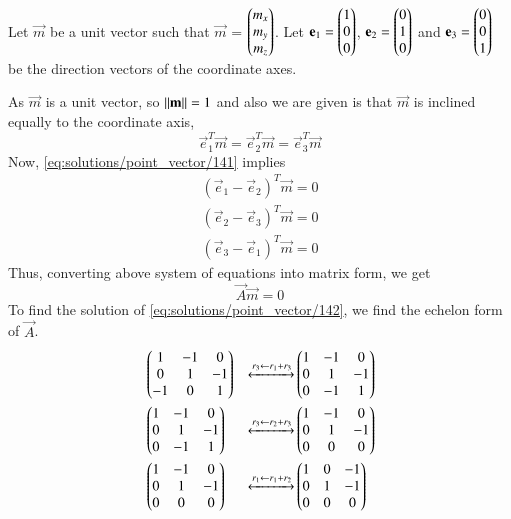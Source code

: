Let $\vec{m}$ be a unit vector such that $\vec{m}$ = $\begin{pmatrix}m_x \\ m_y \\ m_z\end{pmatrix}$. Let $\mathbf{e}_1=\begin{pmatrix}1 \\ 0 \\ 0\end{pmatrix}$, $\mathbf{e}_2=\begin{pmatrix}0 \\ 1 \\ 0\end{pmatrix}$ and $\mathbf{e}_3=\begin{pmatrix}0 \\ 0 \\ 1\end{pmatrix}$ be the direction vectors of the coordinate axes. 

As $\vec{m}$ is a unit vector, so $\left\lVert\mathbf{m}\right\rVert =1$ and also we are given is that $\vec{m}$ is inclined equally to the coordinate axis,
\begin{equation}
\label{eq:solutions/point_vector/141}
	\vec{e}_1^T\vec{m} =\vec{e}_2^T\vec{m}=\vec{e}_3^T\vec{m}
\end{equation}
Now, \ref{eq:solutions/point_vector/141} implies 
\begin{align}
	(\vec{e}_1 -\vec{e}_2)^T\vec{m} = 0 \\
	(\vec{e}_2 -\vec{e}_3)^T\vec{m} = 0 \\
	(\vec{e}_3 -\vec{e}_1)^T\vec{m} = 0
\end{align}
Thus, converting above system of equations into matrix form, we get
\begin{equation}
\label{eq:solutions/point_vector/142}
	\vec{A}\vec{m} = 0
\end{equation}
To find the solution of \ref{eq:solutions/point_vector/142}, we find the  echelon form of  $\vec{A}$.
\begin{align}
	& \begin{pmatrix}  1  & -1 &  0 \\  0 &  1 & -1 \\ -1 &  0 &  1 \end{pmatrix} & \xleftrightarrow[]{r_3 \leftarrow r_1 + r_3}  & \begin{pmatrix} 1 & -1 &  0 \\ 0 &  1 & -1 \\ 0 & -1 & 1 \end{pmatrix} \\
	& \begin{pmatrix}1 & -1 & 0 \\ 0 & 1 & -1 \\ 0 & -1 & 1 \end{pmatrix}  &        \xleftrightarrow[]{r_3 \leftarrow r_2 + r_3}  & \begin{pmatrix}1 & -1 & 0 \\ 0 & 1 & -1 \\ 0 & 0 & 0 \end{pmatrix} \\
	& \begin{pmatrix}1 &  -1 & 0 \\ 0 & 1 & -1 \\ 0 & 0 & 0 \end{pmatrix} & \xleftrightarrow[]{r_1 \leftarrow r_1 + r_2}
	& \begin{pmatrix}1 &  0 & -1 \\ 0 & 1 & -1 \\ 0 & 0 & 0 \end{pmatrix}
\label{eq:solutions/point_vector/143}
\end{align}
